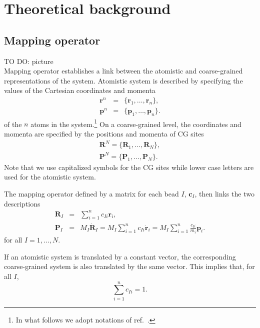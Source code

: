 \chapter{Theoretical background}

\section{Mapping operator}
\label{sec:mapping_operator}
TO DO: picture \\

Mapping operator establishes a link between the atomistic and coarse-grained representations of the system. Atomistic system is described by specifying the values of the Cartesian coordinates and momenta  
\begin{eqnarray}
\bm r^n &=& \{\bm r_1,\dots,\bm r_n\}, \\
\bm p^n &=& \{\bm p_1,\dots,\bm p_n\}.
\end{eqnarray}
of the $n$ atoms in the system.\footnote{In what follows we adopt notations of ref.~\cite{Noid:2008.1}.} 
%
On a coarse-grained level, the coordinates and momenta are specified by the positions and momenta of CG sites 
\begin{eqnarray}
\bm R^N = \{\bm R_1,\dots,\bm R_N\}, \\ 
\bm P^N = \{\bm P_1,\dots,\bm P_N\}.
\end{eqnarray}
Note that we use capitalized symbols for the CG sites while lower case letters are used for the atomistic system.

The mapping operator defined by a matrix for each bead $I$, ${\bm c}_I$, then links the two descriptions
\begin{eqnarray}
 {\bm R}_I &=& \sum_{i=1}^{n}c_{Ii}\bm r_i, \\
 {\bm P}_I &=& 
 	M_I \dot{{\bm R}}_I = 
	M_I \sum_{i=1}^{n}c_{Ii} \dot{{\bm r}}_i = 
	M_I \sum_{i=1}^{n} \frac{ c_{Ii}} {m_i} {\bm p}_i . 
\label{eq:mapping_scheme}
\end{eqnarray}
for all $I = 1,\dots,N$.

If an atomistic system is translated by a constant vector, the corresponding coarse-grained system is also translated by the same vector. This implies that, for all $I$,
\begin{equation}
 \sum_{i=1}^{n}c_{Ii}=1.
\end{equation}

